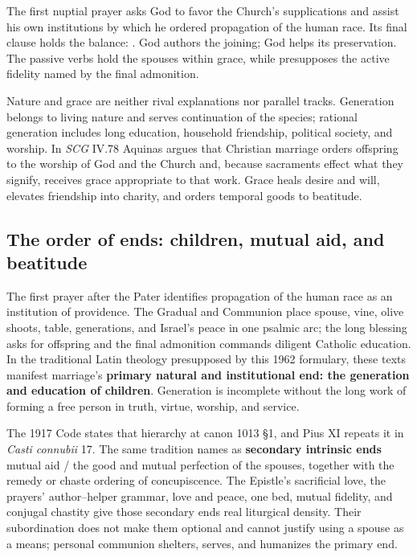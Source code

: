 The first nuptial prayer asks God to favor the Church's supplications and assist his own institutions by which he ordered propagation of the human race. Its final clause holds the balance: . God authors the joining; God helps its preservation. The passive verbs hold the spouses within grace, while  presupposes the active fidelity named by the final admonition.

Nature and grace are neither rival explanations nor parallel tracks. Generation belongs to living nature and serves continuation of the species; rational generation includes long education, household friendship, political society, and worship. In \emph{SCG} IV.78 Aquinas argues that Christian marriage orders offspring to the worship of God and the Church and, because sacraments effect what they signify, receives grace appropriate to that work. Grace heals desire and will, elevates friendship into charity, and orders temporal goods to beatitude.

\sectionguard
\subsection*{The order of ends: children, mutual aid, and beatitude\enspace{}}

The first prayer after the Pater identifies propagation of the human race as an institution of providence. The Gradual and Communion place spouse, vine, olive shoots, table, generations, and Israel's peace in one psalmic arc; the long blessing asks for offspring and the final admonition commands diligent Catholic education. In the traditional Latin theology presupposed by this 1962 formulary, these texts manifest marriage's \textbf{primary natural and institutional end: the generation and education of children}. Generation is incomplete without the long work of forming a free person in truth, virtue, worship, and service.

The 1917 Code states that hierarchy at canon 1013 \S1, and Pius XI repeats it in \emph{Casti connubii} 17. The same tradition names as \textbf{secondary intrinsic ends} mutual aid / the good and mutual perfection of the spouses, together with the remedy or chaste ordering of concupiscence. The Epistle's sacrificial love, the prayers' author--helper grammar, love and peace, one bed, mutual fidelity, and conjugal chastity give those secondary ends real liturgical density. Their subordination does not make them optional and cannot justify using a spouse as a means; personal communion shelters, serves, and humanizes the primary end.

